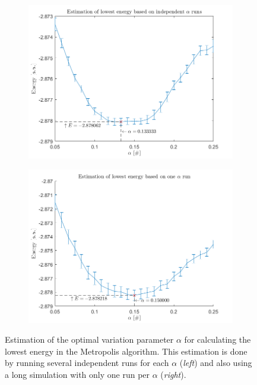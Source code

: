 \begin{figure}[H]
	\centering
	\captionsetup[subfigure]{justification=centering}
	\begin{subfigure}[b]{0.4\textwidth}
		\centering
		\includegraphics[width=\textwidth]{graphics/task3/lowest_energy_indep_alpha.png}
	\end{subfigure}
	\begin{subfigure}[b]{0.4\textwidth}
		\centering
		\includegraphics[width=\textwidth]{graphics/task3/lowest_energy_one_alpha_run.png}
	\end{subfigure}
	\caption{Estimation of the optimal variation parameter $\alpha$ for calculating the lowest energy in the Metropolis algorithm. This estimation is done by running several independent runs for each $\alpha$ (\textit{left}) and also using a long simulation with only one run per $\alpha$ (\textit{right}).}
	\label{fig:optimize_alpha}
\end{figure}

